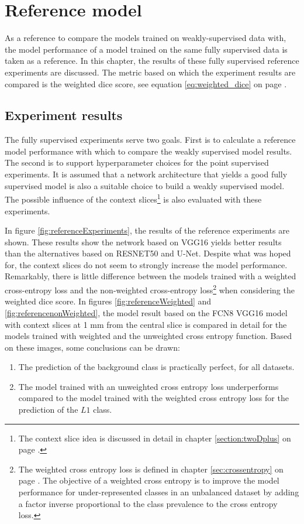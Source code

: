 \chapter{Reference model\label{sec:reference_model}}
\par{
    As a reference to compare the models trained on weakly-supervised data with, the model performance of a model trained on the same fully supervised data is taken as a reference.
    In this chapter, the results of these fully supervised reference experiments are discussed.
    The metric based on which the experiment results are compared is the weighted dice score, see equation \ref{eq:weighted_dice} on page \pageref{eq:weighted_dice}.
}

\section{Experiment results}
\par{
    The fully supervised experiments serve two goals.
    First is to calculate a reference model performance with which to compare the weakly supervised model results.
    The second is to support hyperparameter choices for the point supervised experiments.
    It is assumed that a network architecture that yields a good fully supervised model is also a suitable choice to build a weakly supervised model.
    The possible influence of the context slices\footnote{The context slice idea is discussed in detail in chapter \ref{section:twoDplus} on page \pageref{section:twoDplus}.} is also evaluated with these experiments.
}
\par{
    In figure \ref{fig:referenceExperiments}, the results of the reference experiments are shown.
    These results show the network based on VGG16 yields better results than the alternatives based on RESNET50 and U-Net.
    Despite what was hoped for, the context slices do not seem to strongly increase the model performance.
    Remarkably, there is little difference between the models trained with a weighted cross-entropy loss and the non-weighted cross-entropy loss\footnote{
        The weighted cross entropy loss is defined in chapter \ref{sec:crossentropy} on page \pageref{sec:crossentropy}. 
        The objective of a weighted cross entropy is to improve the model performance for under-represented classes in an unbalanced dataset by adding a factor inverse proportional to the class prevalence to the cross entropy loss.
    } when considering the weighted dice score.
    In figures \ref{fig:referenceWeighted} and \ref{fig:referencenonWeighted}, the model result based on the FCN8 VGG16 model with context slices at 1 mm from the central slice is compared in detail for the models trained with weighted and the unweighted cross entropy function.
    Based on these images, some conclusions can be drawn:
    \begin{enumerate}
        \item The prediction of the background class is practically perfect, for all datasets.
        \item The model trained with an unweighted cross entropy loss underperforms compared to the model trained with the weighted cross entropy loss for the prediction of the $L1$ class.
    \end{enumerate}
}

